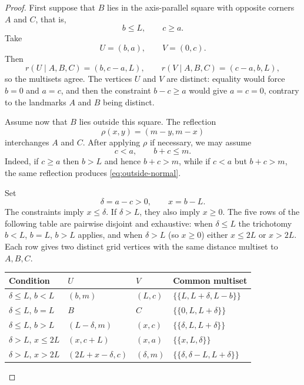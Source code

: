 \documentclass[11pt]{amsart}
\theoremstyle{remark}
\newcommand{\ms}[1]{\mathopen{\{\!\{}#1\mathclose{\}\!\}}}
\begin{document}
\begin{proof}
First suppose that $B$ lies in the axis-parallel square with opposite corners $A$ and $C$, that is,
\[
 b\le L,
 \qquad
 c\ge a.
\]
Take
\[
 U=(b,a),
 \qquad
 V=(0,c).
\]
Then
\[
 r(U\mid A,B,C)=(b,c-a,L),
 \qquad
 r(V\mid A,B,C)=(c-a,b,L),
\]
so the multisets agree.  The vertices $U$ and $V$ are distinct: equality would force $b=0$ and $a=c$, and then the constraint $b-c\ge a$ would give $a=c=0$, contrary to the landmarks $A$ and $B$ being distinct.

Assume now that $B$ lies outside this square.  The reflection
\[
 \rho(x,y)=(m-y,m-x)
\]
interchanges $A$ and $C$.  After applying $\rho$ if necessary, we may assume
\begin{equation}\label{eq:outside-normal}
 c<a,
 \qquad
 b+c\le m.
\end{equation}
Indeed, if $c\ge a$ then $b>L$ and hence $b+c>m$, while if $c<a$ but $b+c>m$, the same reflection produces \eqref{eq:outside-normal}.

Set
\[
 \delta=a-c>0,
 \qquad
 x=b-L.
\]
The constraints imply $x\le\delta$.  If $\delta>L$, they also imply $x\ge0$.  The five rows of the following table are pairwise disjoint and exhaustive: when $\delta\le L$ the trichotomy $b<L$, $b=L$, $b>L$ applies, and when $\delta>L$ (so $x\ge0$) either $x\le2L$ or $x>2L$.  Each row gives two distinct grid vertices with the same distance multiset to $A,B,C$.

\medskip
\begin{center}
\renewcommand{\arraystretch}{1.35}
\begin{tabularx}{\textwidth}{>{\raggedright\arraybackslash}p{} >{\centering\arraybackslash}p{} >{\centering\arraybackslash}p{} X}
\toprule
Condition & $U$ & $V$ & Common multiset \\
\midrule
$\delta\le L$, $b<L$
& $(b,m)$
& $(L,c)$
& $\ms{L,L+\delta,L-b}$ \\
$\delta\le L$, $b=L$
& $B$
& $C$
& $\ms{0,L,L+\delta}$ \\
$\delta\le L$, $b>L$
& $(L-\delta,m)$
& $(x,c)$
& $\ms{\delta,L,L+\delta}$ \\
$\delta>L$, $x\le2L$
& $(x,c+L)$
& $(x,a)$
& $\ms{x,L,\delta}$ \\
$\delta>L$, $x>2L$
& $(2L+x-\delta,c)$
& $(\delta,m)$
& $\ms{\delta,\delta-L,L+\delta}$ \\
\bottomrule
\end{tabularx}
\end{center}
\medskip


\end{proof}
\end{document}
